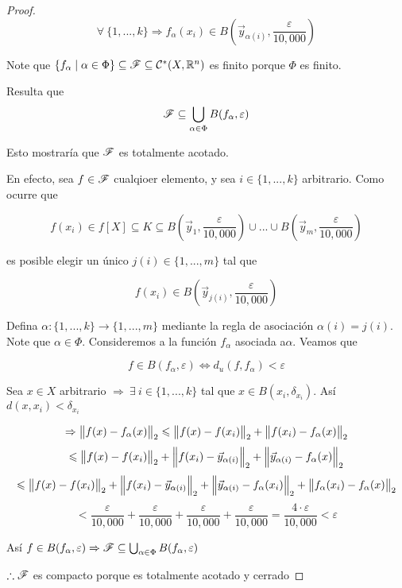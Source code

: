 \begin{proof}
    $$\forall \: \{1, ..., k \} \Rightarrow f_\alpha(x_i) \in B\left({\vec{y}}_{\alpha(i)}, \frac{\varepsilon}{10,000} \right)$$

    Note que $\{ f_\alpha \mid \alpha \in \Phi \} \subseteq \mathscr{F} \subseteq {\ensuremath{\mathcal{C}}}^{\ast}(X,\mathbb{R}^n)$ es finito porque $\Phi$ es finito.

    Resulta que
    $$\mathscr{F} \subseteq \bigcup_{\alpha \in \Phi} B(f_\alpha, \varepsilon)$$

    Esto mostraría que $\mathscr{F}$ es totalmente acotado. 

    En efecto, sea $f \in \mathscr{F}$ cualqioer elemento, y sea $i \in \{ 1, ..., k \}$ arbitrario. Como ocurre que

    $$f(x_i) \in f[X] \subseteq K \subseteq B\left({\vec{y}}_{1}, \frac{\varepsilon}{10,000} \right) \cup ... \cup B\left({\vec{y}}_{m}, \frac{\varepsilon}{10,000} \right)$$

    es posible elegir un único $j(i) \in \{1, ..., m \}$ tal que

    $$f(x_i) \in B\left({\vec{y}}_{j(i)}, \frac{\varepsilon}{10,000} \right)$$

    Defina $\alpha : \{ 1, ..., k \} \to \{1, ..., m\}$ mediante la regla de asociación $\alpha(i) = j(i)$. Note que $\alpha \in \Phi$. Consideremos a la función $f_\alpha$ asociada a$ \alpha$. Veamos que

    $$f \in B(f_\alpha, \varepsilon) \iff d_u(f,f_\alpha) < \varepsilon$$

    Sea $x \in X$ arbitrario $\Rightarrow \: \exists \: i \in \{1, ..., k \}$ tal que $x \in B(x_i, \delta_{x_i})$. Así $d(x,x_i) < \delta_{x_i}$

    $$\Rightarrow {\norm{f(x)-f_\alpha(x)}}_{2} \leqslant {\norm{f(x)-f(x_i)}}_{2} + {\norm{f(x_i)-f_\alpha(x)}}_{2}$$
    $$\leqslant {\norm{f(x)-f(x_i)}}_{2} + {\norm{f(x_i)-{\vec{y}}_{\alpha(i)}}}_{2} + {\norm{{\vec{y}}_{\alpha(i)}-f_\alpha(x)}}_{2} $$
    $$\leqslant {\norm{f(x)-f(x_i)}}_{2} + {\norm{f(x_i)-{\vec{y}}_{\alpha(i)}}}_{2} + {\norm{{\vec{y}}_{\alpha(i)}-f_\alpha(x_i)}}_{2} + {\norm{f_\alpha(x_i)-f_\alpha(x)}}_{2}$$
    $$< \frac{\varepsilon}{10,000} + \frac{\varepsilon}{10,000} + \frac{\varepsilon}{10,000} + \frac{\varepsilon}{10,000} = \frac{4\cdot \varepsilon}{10,000} < \varepsilon$$

    Así $f \in B(f_\alpha, \varepsilon) \Rightarrow \mathscr{F} \subseteq \bigcup_{\alpha \in \Phi} B(f_\alpha, \varepsilon)$

    $\therefore \mathscr{F}$ es compacto porque es totalmente acotado y cerrado
\end{proof}


